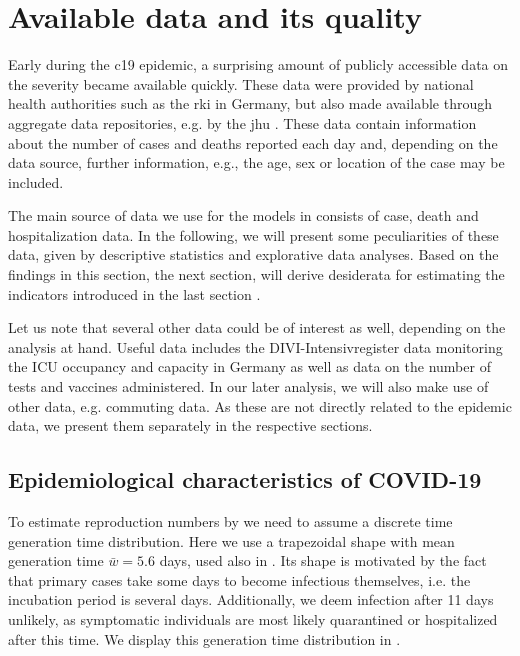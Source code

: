 \section{Available data and its quality}
\label{sec:data}

Early during the \acrshort{c19} epidemic, a surprising amount of publicly accessible data on the severity became available quickly. These data were provided by national health authorities such as the \acrfull{rki} in Germany, but also made available through aggregate data repositories, e.g. by the \acrfull{jhu} \citep{Dong2020Interactive}. These data contain information about the number of cases and deaths reported each day and, depending on the data source, further information, e.g., the age, sex or location of the case may be included. 

The main source of data we use for the models in  consists of case, death and hospitalization data. In the following, we will present some peculiarities of these data, given by descriptive statistics and explorative data analyses. Based on the findings in this section, the next section,  will derive desiderata for estimating the indicators introduced in the last section .

Let us note that several other data could be of interest as well, depending on the analysis at hand. Useful data includes the DIVI-Intensivregister data monitoring the ICU occupancy and capacity in Germany as well as data on the number of tests and vaccines administered. In our later analysis, we will also make use of other data, e.g. commuting data. As these are not directly related to the epidemic data, we present them separately in the respective sections.

\subsection{Epidemiological characteristics of COVID-19}
To estimate reproduction numbers by  we need to assume a discrete time generation time distribution. Here we use a trapezoidal shape with mean generation time $\bar w = 5.6$ days, used also in \citep{Burgard2021Regional}. Its shape is motivated by the fact that primary cases take some days to become infectious themselves, i.e. the incubation period is several days. Additionally, we deem infection after 11 days unlikely, as symptomatic individuals are most likely quarantined or hospitalized after this time. We display this generation time distribution in . 

